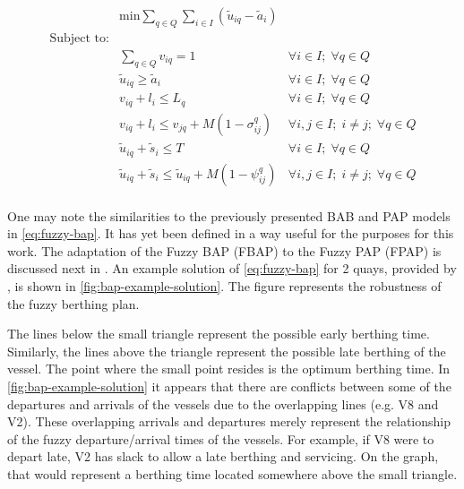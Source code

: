 \documentclass[ee,thesis]{usuthesis}
\begin{document}
\begin{equation}
\label{eq:fuzzy-bap}
\begin{array}{lll}
                   & \text{min} \sum_{q \in Q}\sum_{i \in I} (\tilde{u}_{iq} - \tilde{a}_i)           &                                \\
\text{Subject to:} &                                                             &                                    \\
                   & \sum_{q \in Q} v_{iq} = 1                                          & \forall i \in I;\; \forall q \in Q               \\
                   & \tilde{u}_{iq} \ge \tilde{a}_i                                 & \forall i \in I;\; \forall q \in Q                \\
                   & v_{iq} + l_i \le L_q                                           & \forall i \in I;\; \forall q \in Q                \\
                   & v_{iq} + l_i \le v_{jq} + M(1-\sigma^q_{ij})                           & \forall i,j \in I;\; i \ne j;\; \forall q \in Q   \\
                   & \tilde{u}_{iq} + \tilde{s}_i \le T                             & \forall i \in I;\; \forall q \in Q                \\
                   & \tilde{u}_{iq} + \tilde{s}_i \le \tilde{u}_{iq} + M(1-\psi^q_{ij})   & \forall i,j \in I;\; i \ne j;\; \forall q \in Q \\
\end{array}
\end{equation}

One may note the similarities to the previously presented BAB and PAP models in \ref{eq:fuzzy-bap}. It has yet been defined
in a way useful for the purposes for this work. The adaptation of the Fuzzy BAP (FBAP) to the Fuzzy PAP (FPAP) is
discussed next in . An example solution of \ref{eq:fuzzy-bap} for 2 quays, provided by
\cite{bello-2019-fuzzy-activ}, is shown in \ref{fig:bap-example-solution}. The figure represents the robustness of the fuzzy
berthing plan.

The lines below the small triangle represent the possible early berthing time. Similarly, the lines above the triangle
represent the possible late berthing of the vessel. The point where the small point resides is the optimum berthing
time. In \ref{fig:bap-example-solution} it appears that there are conflicts between some of the departures and arrivals of the
vessels due to the overlapping lines (e.g. V8 and V2). These overlapping arrivals and departures merely represent the
relationship of the fuzzy departure/arrival times of the vessels. For example, if V8 were to depart late, V2 has slack
to allow a late berthing and servicing. On the graph, that would represent a berthing time located somewhere above the
small triangle.
\end{document}
